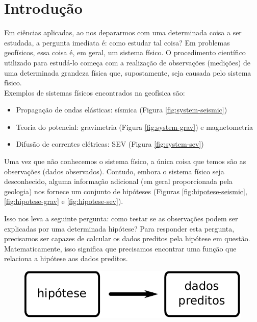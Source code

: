 \chapter{Introdução}
\label{chap:intro}

\indent Em ciências aplicadas, ao nos depararmos com uma determinada coisa a ser
estudada, a pergunta imediata é: como estudar tal coisa? Em problemas geofísicos,
essa coisa é, em geral, um sistema físico. O procedimento científico utilizado
para estudá-lo começa com a realização de observações (medições) de uma
determinada grandeza física que, supostamente, seja causada pelo sistema físico.
\\
\indent Exemplos de sistemas físicos encontrados na geofísica são:

\begin{itemize}
    \item{Propagação de ondas elásticas: sísmica (Figura \ref{fig:system-seismic})}
    \item{Teoria do potencial: gravimetria (Figura \ref{fig:system-grav}) e magnetometria}
    \item{Difusão de correntes elétricas: SEV (Figura \ref{fig:system-sev})}
\end{itemize}

\indent Uma vez que não conhecemos o sistema físico, a única coisa que temos são as
observações (dados observados). Contudo, embora o sistema físico seja
desconhecido, alguma informação adicional (em geral proporcionada pela geologia)
nos fornece um conjunto de hipóteses (Figuras \ref{fig:hipotese-seismic},
\ref{fig:hipotese-grav} e \ref{fig:hipotese-sev}).


\indent Isso nos leva a seguinte pergunta: como testar se as observações podem ser
explicadas por uma determinada hipótese? Para responder esta pergunta,
precisamos ser capazes de calcular os dados preditos pela hipótese em questão.
Matematicamente, isso significa que precisamos encontrar uma função que
relaciona a hipótese aos dados preditos.

\begin{figure}[!htb]
  \centering
    \includegraphics[scale=1]{figs/hipotese-preditos}
  \label{fig:hipotese-preditos}
\end{figure}


